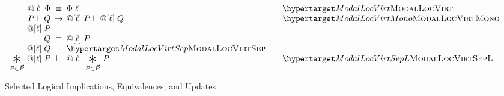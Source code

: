 \begin{figure}
  \[
  \begin{array}{r@{\;}c@{\;}lll}
\modaldef\ell\Phi
& \logequiv &
\modaldefunfold\ell\Phi
&& \TirNameStyle{ModalLocVirt}
\\

\modalP \vdash \modalQ & \rightarrow & \modaldef\ell\modalP \vdash \modaldef\ell\modalQ && \TirNameStyle{ModalLocVirtMono}
\\

\modaldef\ell{\modalstar\modalP\modalQ} & \logequiv & \modaldef\ell\modalP \star \modaldef\ell\modalQ &&\TirNameStyle{ModalLocVirtSep}
\\

   \bigast{\modalP \in \modalPs\modalP} { \modaldef\ell\modalP } & \vdash &
   \modaldef\ell{\bigast{\modalP \in \modalPs\modalP} {\modalP}} && \TirNameStyle{ModalLocVirtSepL}
  \end{array}
  \]
\caption{Selected Logical Implications, Equivalences, and Updates}
\label{fig:laws}
\end{figure}
